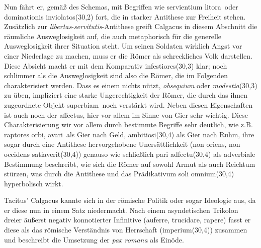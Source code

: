 \documentclass[12pt]{article}
\begin{document}
	Nun fährt er, gemäß des Schemas, mit Begriffen wie \glqq servientium litora\grqq\ oder \glqq dominationis inviolatos\grqq(30,2) fort, die in starker Antithese zur Freiheit stehen. Zusätzlich zur \textit{libertas}-\textit{servitutis}-Antithese greift Calgacus in diesem Abschnitt die räumliche Ausweglosigkeit auf, die auch metaphorisch für die generelle Ausweglosigkeit ihrer Situation steht. Um seinen Soldaten wirklich Angst vor einer Niederlage zu machen, muss er die Römer als schreckliches Volk darstellen. Diese Absicht macht er mit dem Komparativ \glqq infestiores\grqq(30,3) klar; noch schlimmer als die Ausweglosigkeit sind also die Römer, die im Folgenden charakterisiert werden. Dass es einem nichts nützt, \textit{obsequium} oder \textit{modestia}(30,3) zu üben, impliziert eine starke Ungerechtigkeit der Römer, die durch das ihnen zugeordnete Objekt \glqq superbiam\grqq\ noch verstärkt wird. Neben diesen Eigenschaften ist auch noch der \glqq affectus\grqq, hier vor allem im Sinne von Gier sehr wichtig. Diese Charakterisierung wir vor allem durch bestimmte Begriffe sehr deutlich, wie z.B. \glqq raptores orbi\grqq, \glqq avari\grqq\  als Gier nach Geld, \glqq ambitiosi\grqq(30,4) als Gier nach Ruhm, ihre sogar durch eine Antithese hervorgehobene Unersättlichkeit (\glqq non oriens, non occidens satiaverit\grqq(30,4)) genauso wie schließlich \glqq pari adfectu\grqq(30,4) als adverbiale Bestimmung beschreibt, wie sich die Römer auf sowohl Armut als auch Reichtum stürzen, was durch die Antithese und das Prädikativum \glqq soli omnium\grqq(30,4) hyperbolisch wirkt.
	
	Tacitus' Calgacus kannte sich in der römische Politik oder sogar Ideologie aus, da er diese nun in einem Satz niedermacht. Nach einem asyndetischen Trikolon dreier äußerst negativ konnotierter Infinitive (\glqq auferre\grqq, \glqq trucidare\grqq, \glqq rapere\grqq) fasst er diese als das römische Verständnis von Herrschaft (\glqq imperium\grqq(30,4)) zusammen und beschreibt die Umsetzung der \textit{pax romana} als Einöde.
	
\end{document}
